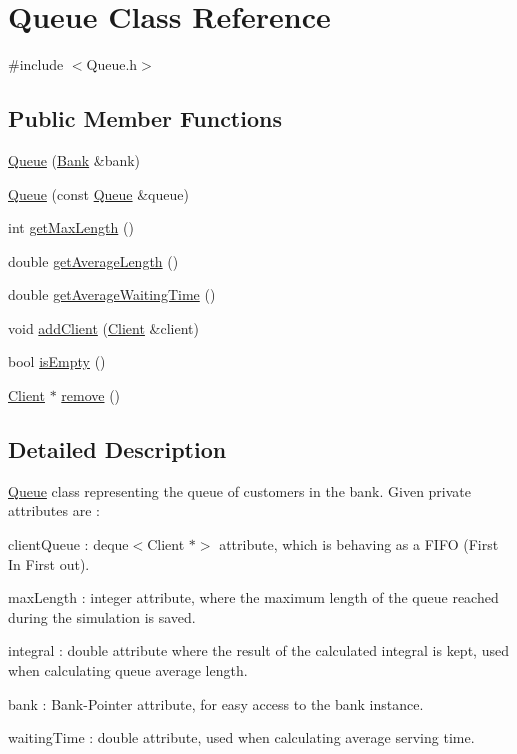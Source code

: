 \hypertarget{classQueue}{}\section{Queue Class Reference}
\label{classQueue}


{\ttfamily \#include $<$Queue.\+h$>$}

\subsection*{Public Member Functions}
\begin{DoxyCompactItemize}
\item 
\hyperlink{classQueue_ae2647f6001471e160dc95362aba43313}{Queue} (\hyperlink{classBank}{Bank} \&bank)
\item 
\hyperlink{classQueue_a4d325dcdfe0550824d529b7aa11535b8}{Queue} (const \hyperlink{classQueue}{Queue} \&queue)
\item 
int \hyperlink{classQueue_ac52fd0970c24510a4d0d3086b027021a}{get\+Max\+Length} ()
\item 
double \hyperlink{classQueue_afc73e60fa330498b5efdbf267d4508c2}{get\+Average\+Length} ()
\item 
double \hyperlink{classQueue_a21c1c1c4732177f6b8d8433ae5b4d771}{get\+Average\+Waiting\+Time} ()
\item 
void \hyperlink{classQueue_aa4545b1d42237801b75e0f20c3cc0587}{add\+Client} (\hyperlink{classClient}{Client} \&client)
\item 
bool \hyperlink{classQueue_a65d9b23c23c917faa44981539bc34be7}{is\+Empty} ()
\item 
\hyperlink{classClient}{Client} $\ast$ \hyperlink{classQueue_a2767e32f2c7f51eedf0b75af9d944f67}{remove} ()
\end{DoxyCompactItemize}


\subsection{Detailed Description}
\hyperlink{classQueue}{Queue} class representing the queue of customers in the bank. Given private attributes are \+:
\begin{DoxyItemize}
\item client\+Queue \+: deque$<$\+Client $\ast$$>$ attribute, which is behaving as a F\+I\+FO (First In First out).
\item max\+Length \+: integer attribute, where the maximum length of the queue reached during the simulation is saved.
\item integral \+: double attribute where the result of the calculated integral is kept, used when calculating queue average length.
\item bank \+: Bank-\/\+Pointer attribute, for easy access to the bank instance.
\item waiting\+Time \+: double attribute, used when calculating average serving time. 
\end{DoxyItemize}

